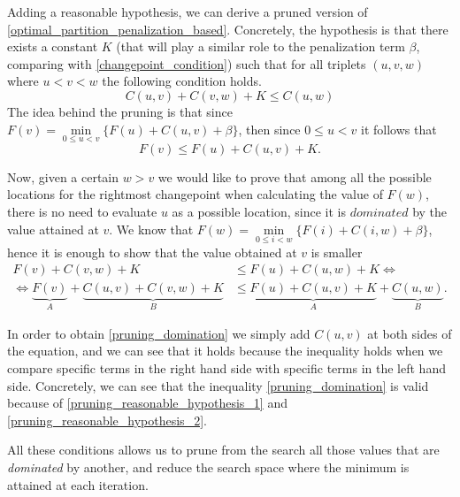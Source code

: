 \documentclass[pdflatex,sn-mathphys]{sn-jnl}%
\theoremstyle{thmstyleone}%
\theoremstyle{thmstyletwo}%
\theoremstyle{thmstylethree}%
\begin{document}
Adding a reasonable hypothesis, we can derive a pruned version of \ref{optimal_partition_penalization_based}. Concretely, the hypothesis is that there exists a constant $K$ (that will play a similar role to the penalization term $\beta$, comparing with \ref{changepoint_condition}) such that for all triplets $(u, v, w)$ where $u < v < w$ the following condition holds.
\begin{equation}
    C(u, v) + C(v,w) + K \leq C(u,w)
    \label{pruning_reasonable_hypothesis_1}
\end{equation}
The idea behind the pruning is that since $F(v) = \underset{0\leq u < v}{\min} \{ F(u) + C(u,v) + \beta \}$, then since $0 \leq u < v$ it follows that 
\begin{equation}
    F(v) \leq F(u) + C(u,v) + K.
    \label{pruning_reasonable_hypothesis_2}
\end{equation} 

Now, given a certain $w > v$ we would like to prove that among all the possible locations for the rightmost changepoint when calculating the value of $F(w)$, there is no need to evaluate $u$ as a possible location, since it is $\textit{dominated}$ by the value attained at $v$. We know that $F(w) = \underset{0\leq i < w}{\min} \{ F(i) + C(i,w) + \beta \}$, hence it is enough to show that the value obtained at $v$ is smaller
\begin{align}
    F(v) + C(v, w) + K & \leq F(u) + C(u,w) + K \nonumber \iff \\
    \iff \underbrace{F(v)}_{\boxed{A}} + \underbrace{C(u,v) + C(v, w) + K}_{\boxed{B}} & \leq \underbrace{F(u) + C(u,v) + K}_{\boxed{A}} + \underbrace{C(u,w)}_{\boxed{B}}.
    \label{pruning_domination}
\end{align}

In order to obtain \ref{pruning_domination} we simply add $C(u,v)$ at both sides of the equation, and we can see that it holds because the inequality holds when we compare specific terms in the right hand side with specific terms in the left hand side. Concretely, we can see that the inequality \ref{pruning_domination} is valid because of \ref{pruning_reasonable_hypothesis_1} and \ref{pruning_reasonable_hypothesis_2}.

All these conditions allows us to prune from the search all those values that are \textit{dominated} by another, and reduce the search space where the minimum is attained at each iteration.
\end{document}
